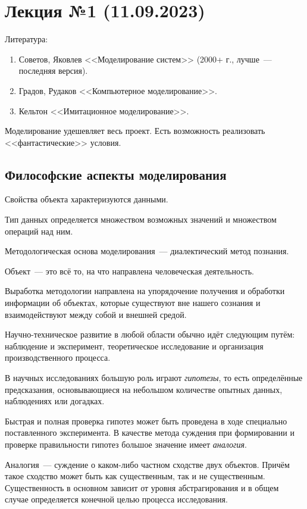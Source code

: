 \section{Лекция №1 (11.09.2023)}

Литература:

\begin{enumerate}
    \item Советов, Яковлев <<Моделирование систем>> (2000+ г., лучше~--- последняя версия).
    \item Градов, Рудаков <<Компьютерное моделирование>>.
    \item Кельтон <<Имитационное моделирование>>.
\end{enumerate}

Моделирование удешевляет весь проект. Есть возможность реализовать <<фантастические>> условия.

\subsection{Философские аспекты моделирования}

Свойства объекта характеризуются данными.

Тип данных определяется множеством возможных значений и множеством операций над ним.

Методологическая основа моделирования~--- диалектический метод познания.

\begin{dd}
    Объект~--- это всё то, на что направлена человеческая деятельность.
\end{dd}

Выработка методологии направлена на упорядочение получения и обработки информации об объектах, которые существуют вне нашего сознания и взаимодействуют между собой и внешней средой.

Научно-техническое развитие в любой области обычно идёт следующим путём: наблюдение и эксперимент, теоретическое исследование и организация производственного процесса.

В научных исследованиях большую роль играют \textit{гипотезы}, то есть определённые предсказания, основывающиеся на небольшом количестве опытных данных, наблюдениях или догадках.

Быстрая и полная проверка гипотез может быть проведена в ходе специально поставленного эксперимента. В качестве метода суждения при формировании и проверке правильности гипотез большое значение имеет \textit{аналогия}.

\begin{dd}
    Аналогия~--- суждение о каком-либо частном сходстве двух объектов. Причём такое сходство может быть как существенным, так и не существенным. Существенность в основном зависит от уровня абстрагирования и в общем случае определяется конечной целью процесса исследования.
\end{dd}


